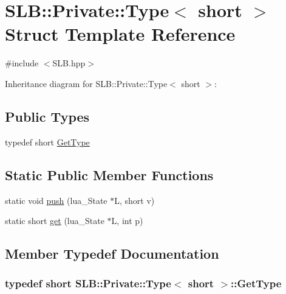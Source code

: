\hypertarget{structSLB_1_1Private_1_1Type_3_01short_01_4}{}\section{S\+LB\+:\+:Private\+:\+:Type$<$ short $>$ Struct Template Reference}
\label{structSLB_1_1Private_1_1Type_3_01short_01_4}


{\ttfamily \#include $<$S\+L\+B.\+hpp$>$}



Inheritance diagram for S\+LB\+:\+:Private\+:\+:Type$<$ short $>$\+:
\subsection*{Public Types}
\begin{DoxyCompactItemize}
\item 
typedef short \hyperlink{structSLB_1_1Private_1_1Type_3_01short_01_4_a3cb769dc0c2fa60efcf497c50acc2576}{Get\+Type}
\end{DoxyCompactItemize}
\subsection*{Static Public Member Functions}
\begin{DoxyCompactItemize}
\item 
static void \hyperlink{structSLB_1_1Private_1_1Type_3_01short_01_4_a4522f331d50ece300c8796a3b1442527}{push} (lua\+\_\+\+State $\ast$L, short v)
\item 
static short \hyperlink{structSLB_1_1Private_1_1Type_3_01short_01_4_a31a7a3c29ab4d7641590a6584b456ac6}{get} (lua\+\_\+\+State $\ast$L, int p)
\end{DoxyCompactItemize}


\subsection{Member Typedef Documentation}
\subsubsection[{\texorpdfstring{Get\+Type}{GetType}}]{\setlength{\rightskip}{0pt plus 5cm}typedef short {\bf S\+L\+B\+::\+Private\+::\+Type}$<$ short $>$\+::{\bf Get\+Type}}\hypertarget{structSLB_1_1Private_1_1Type_3_01short_01_4_a3cb769dc0c2fa60efcf497c50acc2576}{}\label{structSLB_1_1Private_1_1Type_3_01short_01_4_a3cb769dc0c2fa60efcf497c50acc2576}


